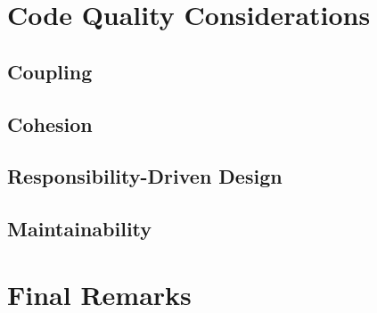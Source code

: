 \documentclass[10pt, a4paper]{scrartcl}
\begin{document}
\begin{multicols}{2}
    \section{Code Quality Considerations}

    \subsection{Coupling}


    \subsection{Cohesion}


    \subsection{Responsibility-Driven Design}


    \subsection{Maintainability}


    \section{Final Remarks}


  \end{multicols}
\end{document}
